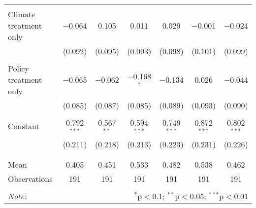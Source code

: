 \begin{tabular}{@{\extracolsep{5pt}}lcccccc}
  & & & & & & \\ 
 Climate treatment only & $-$0.064 & 0.105 & 0.011 & 0.029 & $-$0.001 & $-$0.024 \\ 
  & (0.092) & (0.095) & (0.093) & (0.098) & (0.101) & (0.099) \\ 
  & & & & & & \\ 
 Policy treatment only & $-$0.065 & $-$0.062 & $-$0.168$^{*}$ & $-$0.134 & 0.026 & $-$0.044 \\ 
  & (0.085) & (0.087) & (0.085) & (0.089) & (0.093) & (0.090) \\ 
  & & & & & & \\ 
 Constant & 0.792$^{***}$ & 0.567$^{**}$ & 0.594$^{***}$ & 0.749$^{***}$ & 0.872$^{***}$ & 0.802$^{***}$ \\ 
  & (0.211) & (0.218) & (0.213) & (0.223) & (0.231) & (0.226) \\ 
  & & & & & & \\ 
\hline \\[-1.8ex] 
Mean & 0.405 & 0.451 & 0.533 & 0.482 & 0.538 & 0.462 \\ 
Observations & 191 & 191 & 191 & 191 & 191 & 191 \\ 
\hline 
\hline \\[-1.8ex] 
\textit{Note:}  & \multicolumn{6}{r}{$^{*}$p$<$0.1; $^{**}$p$<$0.05; $^{***}$p$<$0.01} \\ 
\end{tabular} 
